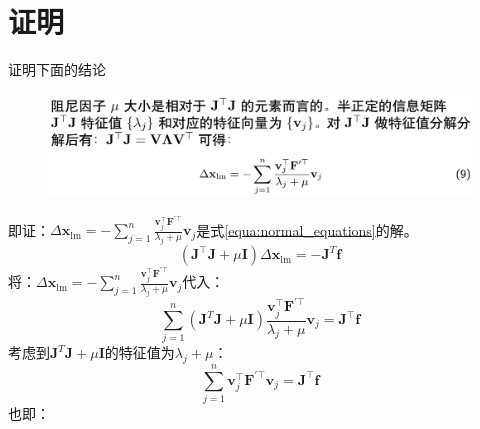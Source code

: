 \documentclass[oneside]{article}
\begin{document}
\section{证明}
证明下面的结论

\begin{figure}[h]
    \centering
    \includegraphics[width=.8\linewidth]{figures/fig4.png}    
\end{figure}

即证：$\Delta \mathbf{x}_{\operatorname{lm}}=-\sum_{j=1}^{n} \frac{\mathbf{v}_{j}^{\top} \mathbf{F}^{\prime \top}}{\lambda_{j}+\mu} \mathbf{v}_{j}$是式\ref{equa:normal_equations}的解。
\begin{equation}
    (\mathbf{J}^\top\mathbf{J} + \mu \mathbf{I}) \Delta \mathbf{x}_{\operatorname{lm}} = - \mathbf{J} ^T  \mathbf{f}
    \label{equa:normal_equations}
\end{equation}
将：$\Delta \mathbf{x}_{\operatorname{lm}}=-\sum_{j=1}^{n} \frac{\mathbf{v}_{j}^{\top} \mathbf{F}^{\prime \top}}{\lambda_{j}+\mu} \mathbf{v}_{j}$代入：
\begin{equation}
    \sum_{j=1}^{n}(\mathbf{J}^T\mathbf{J} + \mu \mathbf{I})  \frac{\mathbf{v}_{j}^{\top} \mathbf{F}^{\prime \top}}{\lambda_{j}+\mu} \mathbf{v}_{j} = \mathbf{J} ^\top  \mathbf{f}
\end{equation}
考虑到$\mathbf{J}^T\mathbf{J} + \mu \mathbf{I}$的特征值为$\lambda_{j}+\mu$：
\begin{equation}
    \sum_{j=1}^{n} \mathbf{v}_{j}^{\top} \mathbf{F}^{\prime \top} \mathbf{v}_{j} = \mathbf{J} ^\top  \mathbf{f} 
\end{equation}
也即：
\end{document}
